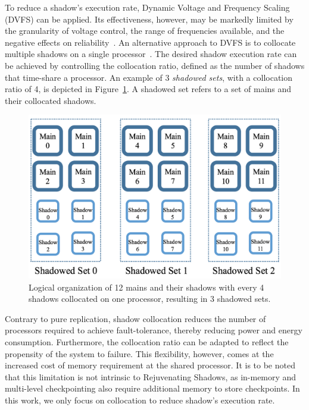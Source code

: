 To reduce a shadow's execution rate, Dynamic Voltage and Frequency Scaling (DVFS) can be applied. 
Its effectiveness, however, may be markedly limited by the granularity of voltage control, the range of frequencies available, and the negative effects on reliability~\cite{Eyerman:2011:FDU:1952998.1952999}.  
An alternative approach to DVFS is to collocate multiple shadows on a single processor~\cite{cui_2016_scalcom}. The desired shadow execution rate can be achieved by controlling the collocation ratio, defined as the number of shadows that time-share a processor. An example of 3 \textit{shadowed sets}, with a collocation ratio of 4, is depicted in Figure~\ref{fig:logical_org}. A shadowed set refers to a set of mains and their collocated shadows. 

\begin{figure}[!t]
  \begin{center}
      \includegraphics[width=\columnwidth]{Figures/logical_org_hpcc}
  \end{center}
  \caption{Logical organization of 12 mains and their shadows with every 4 shadows collocated on one processor, resulting in 3 shadowed sets.}
  \label{fig:logical_org}
  \vskip -0.25in
\end{figure}

Contrary to pure replication, shadow collocation reduces the number of processors required to achieve fault-tolerance, thereby reducing power and energy consumption. Furthermore, the collocation ratio can be adapted to reflect the propensity of the system to failure. This flexibility, however, comes at the increased cost of memory requirement at the shared processor. It is to be noted that this limitation is not intrinsic to Rejuvenating Shadows, as in-memory and multi-level checkpointing also require additional memory to store checkpoints. In this work, we only focus on collocation to reduce shadow's execution rate. 

